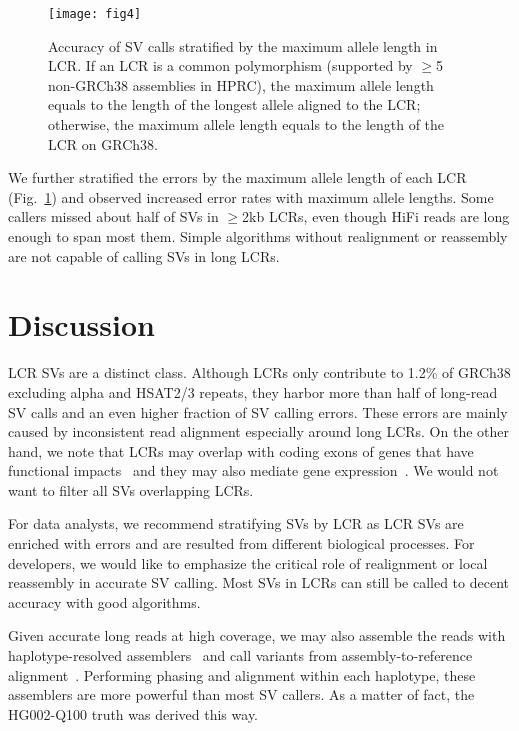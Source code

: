 \documentclass[a4paper,num-refs]{oup-contemporary}
\begin{document}

\begin{figure}[tb]
\texttt{[image: fig4]}
\caption{Accuracy of SV calls stratified by the maximum allele length in LCR.
If an LCR is a common polymorphism (supported by $\ge$5 non-GRCh38 assemblies in HPRC),
the maximum allele length equals to the length of the longest allele aligned to the LCR;
otherwise, the maximum allele length equals to the length of the LCR on GRCh38.
}\label{fig:len}
\end{figure}

We further stratified the errors by the maximum allele length of each LCR (Fig.~\ref{fig:len})
and observed increased error rates with maximum allele lengths.
Some callers missed about half of SVs in $\ge$2kb LCRs,
even though HiFi reads are long enough to span most them.
Simple algorithms without realignment or reassembly
are not capable of calling SVs in long LCRs.

\section{Discussion}

LCR SVs are a distinct class.
Although LCRs only contribute to 1.2\% of GRCh38 excluding alpha and HSAT2/3 repeats,
they harbor more than half of long-read SV calls and an even higher fraction of SV calling errors.
These errors are mainly caused by inconsistent read alignment especially around long LCRs.
On the other hand, we note that LCRs may overlap with coding exons of genes that have functional impacts~\cite{Mukamel:2021aa}
and they may
also mediate gene expression~\cite{Bakhtiari:2021aa,Lu:2023aa}.
We would not want to filter all SVs overlapping LCRs.

For data analysts, we recommend stratifying SVs by LCR
as LCR SVs are enriched with errors and are resulted from different biological processes.
For developers, we would like to emphasize the critical role of realignment or local reassembly in accurate SV calling.
Most SVs in LCRs can still be called to decent accuracy with good algorithms.

Given accurate long reads at high coverage, we may also assemble
the reads with haplotype-resolved assemblers~\cite{Cheng:2021aa,Rautiainen:2023ab}
and call variants from assembly-to-reference alignment~\cite{Li:2018aa}.
Performing phasing and alignment within each haplotype,
these assemblers are more powerful than most SV callers.
As a matter of fact, the HG002-Q100 truth was derived this way.
\end{document}
